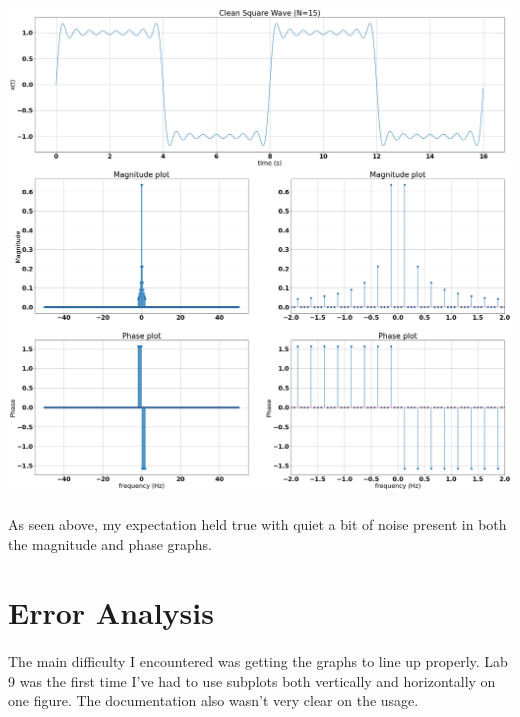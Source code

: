 \documentclass[12pt]{report}
\begin{document}
    \includegraphics[scale=0.25]{Figure 2022-03-22 205111 (6).png}

    \paragraph{} As seen above, my expectation held true with quiet a bit of noise present in both the magnitude and phase graphs. 

\section{Error Analysis}


\paragraph{} The main difficulty I encountered was getting the graphs to line up properly. Lab 9 was the first time I've had to use subplots both vertically and horizontally on one figure. The documentation also wasn't very clear on the usage.  
\end{document}
